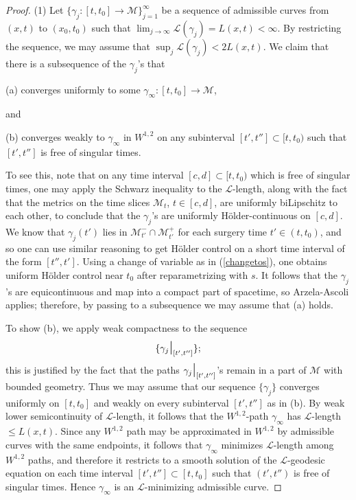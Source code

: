 \documentclass[12pt]{amsart}
\renewcommand{\L}{{\mathcal L}}
\newcommand{\M}{{\mathcal M}}
\newcommand{\restr}{\mbox{\Large \(|\)\normalsize}}
\newcommand{\ga}{\gamma}
\newcommand{\ra}{\rightarrow}
\numberwithin{equation}{section}
\theoremstyle{plain}
\theoremstyle{definition}
\theoremstyle{remark}
\begin{document}
\begin{proof}
(1)   Let 
$\{\ga_j:[t,t_0]\ra\M\}_{j=1}^\infty$ be a sequence of
admissible curves from $(x,t)$ to $(x_0,t_0)$ such that
$\lim_{j\ra\infty}\L(\ga_j)=L(x,t)<\infty$. By restricting the sequence,
we may assume that
$\sup_j \L(\ga_j)<2L(x,t)$.
We claim that there is 
a subsequence of the $\ga_j$'s  that 

(a) converges uniformly to some $\ga_\infty:[t,t_0]\ra\M$,

and

(b) converges weakly to $\ga_\infty$ in $W^{1,2}$ on any  subinterval 
$[t',t'']\subset [t,t_0)$ such that $[t',t'']$ is free of singular times.

\noindent
To see this, note that on any time interval $[c,d]\subset [t,t_0)$
which is free of singular times, one may apply the Schwarz inequality
to the $\L$-length, along with the fact that the metrics on the time
slices $\M_t$, $t \in [c,d]$, are uniformly biLipschitz to each other,
to conclude that the $\ga_j$'s are uniformly
H\"older-continuous on $[c,d]$.  We know
that $\ga_j(t')$ lies in $\M_{t'}^-\cap \M_{t'}^+$ for each surgery
time $t'\in (t,t_0)$, and so one can use similar reasoning to get
H\"older control on a short time interval of the form $[t'',t']$.
Using a change of variable as in  (\ref{changetos}), one obtains
uniform H\"older control near $t_0$ after reparametrizing with $s$.
It follows that the $\ga_j$'s are equicontinuous and map into a
compact part of spacetime,  so 
Arzela-Ascoli applies;  therefore, by passing  to a subsequence we
may assume  that (a) holds. 

To show (b),  we apply weak compactness to the sequence
\begin{equation}
\{\ga_j\restr_{[t',t'']}\};
\end{equation}
\noindent
this is justified by the fact that  the paths $\ga_j\restr_{[t',t'']}$'s remain in a part
of $\M$ with  bounded geometry.  Thus we may assume that our sequence $\{\ga_j\}$
converges uniformly on $[t,t_0]$ and weakly on every subinterval $[t',t'']$ as in (b).
By weak lower semicontinuity of $\L$-length, it follows that the $W^{1,2}$-path
$\ga_\infty$ has $\L$-length $\leq L(x,t)$.  Since any $W^{1,2}$ path  may be approximated
in $W^{1,2}$ by  admissible curves with the same endpoints, it follows that $\ga_\infty$
 minimizes $\L$-length among $W^{1,2}$ paths, and therefore 
it restricts to a smooth solution of the $\L$-geodesic equation on each time
interval $[t',t'']\subset [t,t_0]$ such that $(t',t'')$ is free of singular times.  
Hence $\ga_\infty$ is an $\L$-minimizing admissible curve.


\end{proof}
\end{document}
